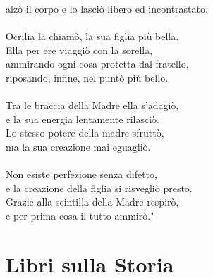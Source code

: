 \documentclass[10pt,twoside,onecolumn,openany]{book}
\begin{document}
\begin{quotebox}
\begin{multicols}{2}
{alzò il corpo e lo lasciò libero ed incontrastato.\\
\\
Ocrilia la chiamò, la sua figlia più bella.\\
Ella per ere viaggiò con la sorella,\\
ammirando ogni cosa protetta dal fratello,\\
riposando, infine, nel puntò più bello.\\
\\
Tra le braccia della Madre ella s'adagiò,\\
e la sua energia lentamente rilasciò.\\
Lo stesso potere della madre sfruttò,\\
ma la sua creazione mai eguagliò.\\
\\
Non esiste perfezione senza difetto,\\
e la creazione della figlia si risvegliò presto.\\
Grazie alla scintilla della Madre respirò,\\
e per prima cosa il tutto ammirò.}"
\end{multicols}
\end{quotebox}
\newpage
\section{Libri sulla Storia}
\end{document}
